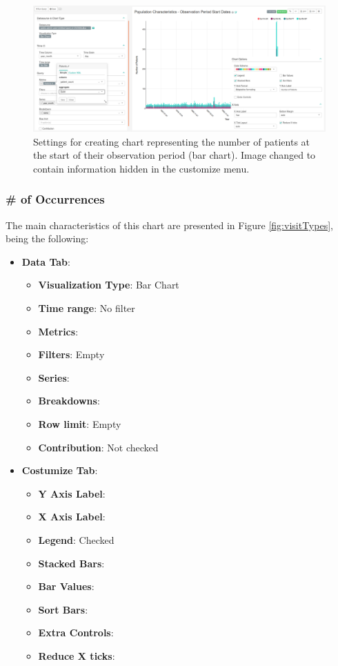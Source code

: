 \documentclass[
]{book}
\providecommand{\tightlist}{%
  \setlength{\itemsep}{0pt}\setlength{\parskip}{0pt}}
\begin{document}
\begin{figure}
\includegraphics[width=1\linewidth]{images/populationCharacteristicsObservationPeriodStartDates} \caption{Settings for creating chart representing the number of patients at the start of their observation period (bar chart). Image changed to contain information hidden in the customize menu.}\label{fig:visitTypes3}
\end{figure}

\hypertarget{of-occurrences}{%
\subsubsection{\# of Occurrences}\label{of-occurrences}}

The main characteristics of this chart are presented in Figure \ref{fig:visitTypes}, being the following:

\begin{itemize}
\tightlist
\item
  \textbf{Data Tab}:

  \begin{itemize}
  \tightlist
  \item
    \textbf{Visualization Type}: Bar Chart
  \item
    \textbf{Time range}: No filter
  \item
    \textbf{Metrics}:
  \item
    \textbf{Filters}: Empty
  \item
    \textbf{Series}:
  \item
    \textbf{Breakdowns}:
  \item
    \textbf{Row limit}: Empty
  \item
    \textbf{Contribution}: Not checked
  \end{itemize}
\item
  \textbf{Costumize Tab}:

  \begin{itemize}
  \tightlist
  \item
    \textbf{Y Axis Label}:
  \item
    \textbf{X Axis Label}:
  \item
    \textbf{Legend}: Checked
  \item
    \textbf{Stacked Bars}:
  \item
    \textbf{Bar Values}:
  \item
    \textbf{Sort Bars}:
  \item
    \textbf{Extra Controls}:
  \item
    \textbf{Reduce X ticks}:
  \end{itemize}
\end{itemize}
\end{document}
